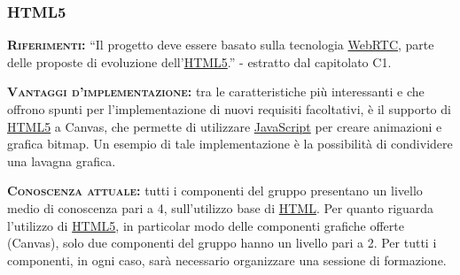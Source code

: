 \subsubsection{HTML5}
\begin{description}
	\item{\scshape\bfseries Riferimenti:} ``Il progetto deve essere basato sulla tecnologia \underline{WebRTC}, parte delle proposte di evoluzione dell'\underline{HTML5}.'' - estratto dal capitolato C1.
	
	\item{\scshape\bfseries Vantaggi d'implementazione:} tra le caratteristiche più interessanti e che offrono spunti per l'implementazione di nuovi requisiti facoltativi, è il supporto di \underline{HTML5} a Canvas, che permette di utilizzare \underline{JavaScript} per creare animazioni e grafica bitmap. Un esempio di tale implementazione è la possibilità di condividere una lavagna grafica.
	
	\item{\scshape\bfseries Conoscenza attuale:} tutti i componenti del gruppo presentano un livello medio di conoscenza pari a 4, sull'utilizzo base di \underline{HTML}. Per quanto riguarda l'utilizzo di \underline{HTML5}, in particolar modo delle componenti grafiche offerte (Canvas), solo due componenti del gruppo hanno un livello pari a 2. Per tutti i componenti, in ogni caso, sarà necessario organizzare una sessione di formazione.
\end{description}


